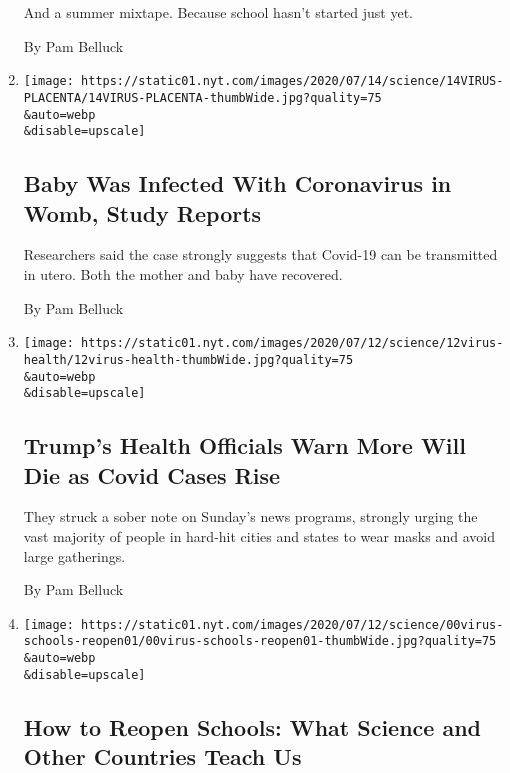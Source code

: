 \begin{enumerate}
  And a summer mixtape. Because school hasn't started just yet.

  By Pam Belluck
\item
  \href{/2020/07/14/health/coronavirus-pregnancy-covid-19.html}{}

  \texttt{[image: https://static01.nyt.com/images/2020/07/14/science/14VIRUS-PLACENTA/14VIRUS-PLACENTA-thumbWide.jpg?quality=75\\\&auto=webp\\\&disable=upscale]}

  \hypertarget{baby-was-infected-with-coronavirus-in-womb-study-reports}{%
  \subsection{Baby Was Infected With Coronavirus in Womb, Study
  Reports}\label{baby-was-infected-with-coronavirus-in-womb-study-reports}}

  Researchers said the case strongly suggests that Covid-19 can be
  transmitted in utero. Both the mother and baby have recovered.

  By Pam Belluck
\item
  \href{/2020/07/12/health/coronavirus-trump-deaths.html}{}

  \texttt{[image: https://static01.nyt.com/images/2020/07/12/science/12virus-health/12virus-health-thumbWide.jpg?quality=75\\\&auto=webp\\\&disable=upscale]}

  \hypertarget{trumps-health-officials-warn-more-will-die-as-covid-cases-rise}{%
  \subsection{Trump's Health Officials Warn More Will Die as Covid Cases
  Rise}\label{trumps-health-officials-warn-more-will-die-as-covid-cases-rise}}

  They struck a sober note on Sunday's news programs, strongly urging
  the vast majority of people in hard-hit cities and states to wear
  masks and avoid large gatherings.

  By Pam Belluck
\item
  \href{/2020/07/11/health/coronavirus-schools-reopen.html}{}

  \texttt{[image: https://static01.nyt.com/images/2020/07/12/science/00virus-schools-reopen01/00virus-schools-reopen01-thumbWide.jpg?quality=75\\\&auto=webp\\\&disable=upscale]}

  \hypertarget{how-to-reopen-schools-what-science-and-other-countries-teach-us}{%
  \subsection{How to Reopen Schools: What Science and Other Countries
  Teach
  Us}\label{how-to-reopen-schools-what-science-and-other-countries-teach-us}}


\end{enumerate}
